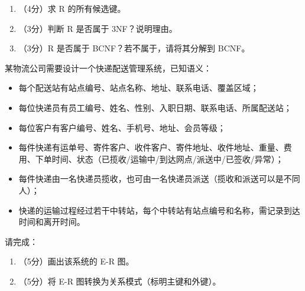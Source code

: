 \documentclass[a4paper,11pt]{article}
\begin{document}
\begin{enumerate}[leftmargin=2em, itemsep=3pt]
  \item[（1）] （4分）求 R 的所有候选键。
  \item[（2）] （3分）判断 R 是否属于 3NF？说明理由。
  \item[（3）] （3分）R 是否属于 BCNF？若不属于，请将其分解到 BCNF。
\end{enumerate}

\anslines{4cm}


\q 某物流公司需要设计一个快递配送管理系统，已知语义：
\begin{itemize}
  \item 每个配送站有站点编号、站点名称、地址、联系电话、覆盖区域；
  \item 每位快递员有员工编号、姓名、性别、入职日期、联系电话、所属配送站；
  \item 每位客户有客户编号、姓名、手机号、地址、会员等级；
  \item 每件快递有运单号、寄件客户、收件客户、寄件地址、收件地址、重量、费用、下单时间、状态（已揽收/运输中/到达网点/派送中/已签收/异常）；
  \item 每件快递由一名快递员揽收，也可由一名快递员派送（揽收和派送可以是不同人）；
  \item 快递的运输过程经过若干中转站，每个中转站有站点编号和名称，需记录到达时间和离开时间。
\end{itemize}
请完成：
\begin{enumerate}[leftmargin=2em, itemsep=3pt]
  \item[（1）] （5分）画出该系统的 E-R 图。
  \item[（2）] （5分）将 E-R 图转换为关系模式（标明主键和外键）。
\end{enumerate}

\anslines{4.5cm}

\end{document}
